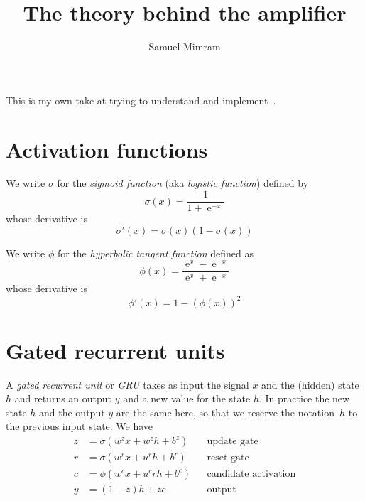 \documentclass[a4paper]{article}
\title{The theory behind the amplifier}
\author{Samuel Mimram}
\newcommand{\ce}{\operatorname{e}}
\begin{document}
\maketitle

This is my own take at trying to understand and implement~\cite{wright2019real}.

\section{Activation functions}
We write $\sigma$ for the \emph{sigmoid function} (aka \emph{logistic function})
defined by
\[
  \sigma(x) = \frac 1 {1 + \ce^{-x}}
\]
whose derivative is
\[
  \sigma'(x) = \sigma(x)(1-\sigma(x))
\]

We write $\phi$ for the \emph{hyperbolic tangent function} defined as
\[
  \phi(x)=\frac{\ce^{x}-\ce^{-x}}{\ce^{x}+\ce^{-x}}
\]
whose derivative is
\[
  \phi'(x)=1-(\phi(x))^2
\]

\section{Gated recurrent units}
A \emph{gated recurrent unit} or \emph{GRU} takes as input the signal $x$ and
the (hidden) state $h$ and returns an output $y$ and a new value for the state
$h$. In practice the new state $h$ and the output $y$ are the same here, so that
we reserve the notation~$h$ to the previous input state. We have
\begin{align*}
  z&=\sigma(w^zx+w^zh+b^z)&&\text{update gate}\\
  r&=\sigma(w^rx+u^rh+b^r)&&\text{reset gate}\\
  c&=\phi(w^cx+u^crh+b^c)&&\text{candidate activation}\\
  y&=(1-z)h+zc&&\text{output}
\end{align*}



\end{document}
